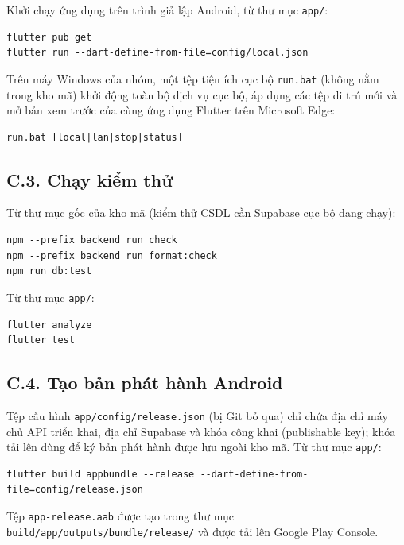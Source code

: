 Khởi chạy ứng dụng trên trình giả lập Android, từ thư mục \texttt{app/}:
\begin{lstlisting}
flutter pub get
flutter run --dart-define-from-file=config/local.json
\end{lstlisting}

Trên máy Windows của nhóm, một tệp tiện ích cục bộ \texttt{run.\allowbreak{}bat} (không nằm trong kho mã) khởi động toàn bộ dịch vụ cục bộ, áp dụng các tệp di trú mới và mở bản xem trước của cùng ứng dụng Flutter trên Microsoft Edge:
\begin{lstlisting}
run.bat [local|lan|stop|status]
\end{lstlisting}

\subsection*{C.3. Chạy kiểm thử}

Từ thư mục gốc của kho mã (kiểm thử CSDL cần Supabase cục bộ đang chạy):
\begin{lstlisting}
npm --prefix backend run check
npm --prefix backend run format:check
npm run db:test
\end{lstlisting}
Từ thư mục \texttt{app/}:
\begin{lstlisting}
flutter analyze
flutter test
\end{lstlisting}

\subsection*{C.4. Tạo bản phát hành Android}

Tệp cấu hình \texttt{app/\allowbreak{}config/\allowbreak{}release.\allowbreak{}json} (bị Git bỏ qua) chỉ chứa địa chỉ máy chủ API triển khai, địa chỉ Supabase và khóa công khai (publishable key); khóa tải lên dùng để ký bản phát hành được lưu ngoài kho mã. Từ thư mục \texttt{app/}:
\begin{lstlisting}
flutter build appbundle --release --dart-define-from-file=config/release.json
\end{lstlisting}
Tệp \texttt{app-\allowbreak{}release.\allowbreak{}aab} được tạo trong thư mục \texttt{build/\allowbreak{}app/\allowbreak{}outputs/\allowbreak{}bundle/\allowbreak{}release/} và được tải lên Google Play Console.
